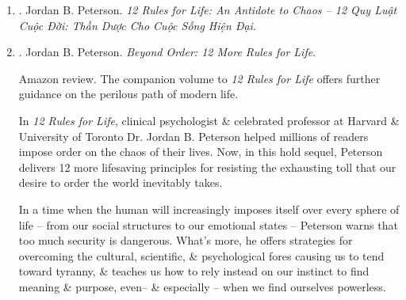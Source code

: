 \documentclass{article}
\begin{document}
\begin{enumerate}
\begin{itemize}
		\item ``1 of the most eclectic\footnote{not following one style or set of ideas but choosing from or using a wide variety. chiết trung, chủ nghĩa chiết trung.} \& stimulating public intellectuals at large today, fearless \& impassioned.'' -- {\it The Guardian}
		\item ``Someone with not only humanity \& humor, but serious depth \& substance $\ldots$ {\sc Peterson} has a truly cosmopolitan \& omnivorous intellect, but one that recognizes that things need grounding in a home if they are ever going to be meaningful grasped $\ldots$ As well as being funny, there is a burning sincerity to the man which only the most withered cynic could suspect.'' -- {\it The Spectator}
		\item ``{\sc Peterson} has become a kind of secular prophet who, in an era of lobotomized conformism, thinks out of the box $\ldots$ His message is overwhelmingly vital.'' -- {\sc Melanie Philips}, {\it The Times}
	\end{itemize}	
	
	\item \cite{Peterson_rule_VN}. {\sc Jordan B. Peterson}. {\it12 Rules for Life: An Antidote to Chaos -- 12 Quy Luật Cuộc Đời: Thần Dược Cho Cuộc Sống Hiện Đại}.\hfill{\sf[done]}
	
	\item \cite{Peterson_beyond_order}. {\sc Jordan B. Peterson}. {\it Beyond Order: 12 More Rules for Life}. {}
	
	{\sf Amazon review.} The companion volume to {\it12 Rules for Life} offers further guidance on the perilous path of modern life.
	
	In {\it12 Rules for Life}, clinical psychologist \& celebrated professor at Harvard \& University of Toronto Dr. {\sc Jordan B. Peterson} helped millions of readers impose order on the chaos of their lives. Now, in this hold sequel, {\sc Peterson} delivers 12 more lifesaving principles for resisting the exhausting toll that our desire to order the world inevitably takes.
	
	In a time when the human will increasingly imposes itself over every sphere of life -- from our social structures to our emotional states -- {\sc Peterson} warns that too much security is dangerous. What's more, he offers strategies for overcoming the cultural, scientific, \& psychological fores causing us to tend toward tyranny, \& teaches us how to rely instead on our instinct to find meaning \& purpose, even-- \& especially -- when we find ourselves powerless.
	

\end{enumerate}
\end{document}
